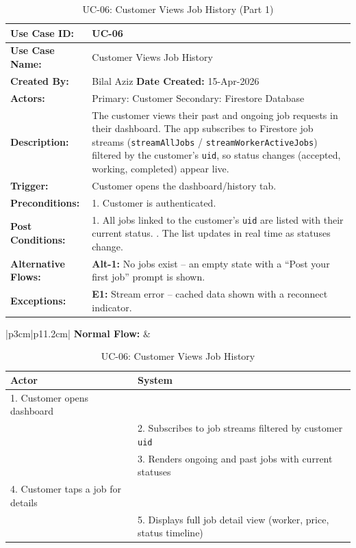 {\small
\renewcommand{\arraystretch}{1.05}
\begin{table}[H]
\centering
\begin{tabular}{|p{3cm}|p{11.2cm}|}
\hline
\textbf{Use Case ID:} & UC-06 \\ \hline
\textbf{Use Case Name:} & Customer Views Job History \\ \hline
\textbf{Created By:} & Bilal Aziz \hfill \textbf{Date Created:} 15-Apr-2026 \\ \hline
\textbf{Actors:} & Primary: Customer \quad Secondary: Firestore Database \\ \hline
\textbf{Description:} & The customer views their past and ongoing job requests in their dashboard. The app subscribes to Firestore job streams (\texttt{streamAllJobs} / \texttt{streamWorkerActiveJobs}) filtered by the customer's \texttt{uid}, so status changes (accepted, working, completed) appear live. \\ \hline
\textbf{Trigger:} & Customer opens the dashboard/history tab. \\ \hline
\textbf{Preconditions:} & 1. Customer is authenticated. \\ \hline
\textbf{Post Conditions:} & 1. All jobs linked to the customer's \texttt{uid} are listed with their current status. \newline 2. The list updates in real time as statuses change. \\ \hline
\textbf{Alternative Flows:} & \textbf{Alt-1:} No jobs exist -- an empty state with a ``Post your first job'' prompt is shown. \\ \hline
\textbf{Exceptions:} & \textbf{E1:} Stream error -- cached data shown with a reconnect indicator. \\ \hline
\end{tabular}
\caption*{UC-06: Customer Views Job History (Part 1)}
\end{table}
}

\newpage

{\small
\renewcommand{\arraystretch}{1.05}
\begin{table}[H]
\centering
\begin{tabular}{|p{3cm}|p{11.2cm}|}
\hline
\textbf{Normal Flow:} &
\begin{tabular}[t]{|p{5.4cm}|p{5.4cm}|}
\hline
\textbf{Actor} & \textbf{System} \\ \hline
1. Customer opens dashboard & \\ \hline
 & 2. Subscribes to job streams filtered by customer \texttt{uid} \\ \hline
 & 3. Renders ongoing and past jobs with current statuses \\ \hline
4. Customer taps a job for details & \\ \hline
 & 5. Displays full job detail view (worker, price, status timeline) \\ \hline
\end{tabular} \\ \hline
\end{tabular}
\caption{UC-06: Customer Views Job History}
\end{table}
}

